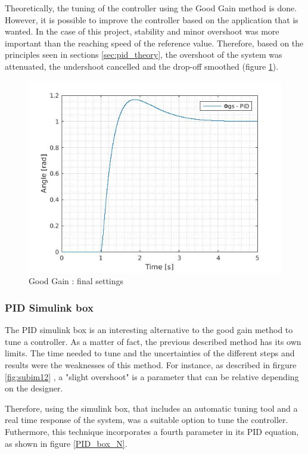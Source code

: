 \vspace{5mm}

Theoretically, the tuning of the controller using the Good Gain method is done. However, it is possible to improve the controller based on the application that is wanted. In the case of this project, stability and minor overshoot was more important than the reaching speed of the reference value. Therefore, based on the principles seen in sections \ref{sec:pid_theory}, the overshoot of the system was attenuated, the undershoot cancelled and the drop-off smoothed (figure \ref{finalGG}).

\begin{figure}[H]
  \centering
  \includegraphics[scale=0.5]{figures/GG5.jpg}
  \caption[LABEL] {Good Gain : final settings}
  \label{finalGG}
\end{figure}


  
\subsubsection{PID Simulink box}
The PID simulink box is an interesting alternative to the good gain method to tune a controller. As a matter of fact, the previous described method has its own limits. The time needed to tune and the uncertainties of the different steps and results were the weaknesses of this method. For instance, as described in firgure \ref{fig:subim12} , a "slight overshoot" is a parameter that can be relative depending on the designer.\par  
  
Therefore, using the simulink box, that includes an automatic tuning tool and a real time response of the system, was a suitable option to tune the controller. Futhermore, this technique incorporates a fourth parameter in its PID equation, as shown in figure \ref{PID_box_N}. 
 
